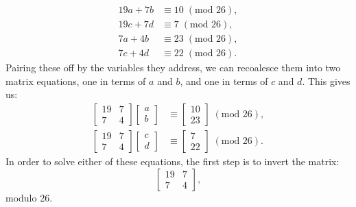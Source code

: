\documentclass{article}
\begin{document}
\begin{align*}
    19a + 7b &\equiv 10 \; (\text{mod } 26), \\
    19c + 7d &\equiv 7 \; (\text{mod } 26), \\
    7a + 4b &\equiv 23 \; (\text{mod } 26), \\
    7c + 4d &\equiv 22 \; (\text{mod } 26).
\end{align*}
Pairing these off by the variables they address, we can recoalesce them into two matrix equations, one in terms of $a$ and $b$, and one in terms of $c$ and $d$. This gives us:
\begin{align*}
    \begin{bmatrix}
        19 & 7 \\
        7 & 4
    \end{bmatrix} \begin{bmatrix}
        a \\
        b
    \end{bmatrix} &\equiv \begin{bmatrix}
        10 \\
        23
    \end{bmatrix} \; (\text{mod } 26), \\
    \begin{bmatrix}
        19 & 7 \\
        7 & 4
    \end{bmatrix} \begin{bmatrix}
        c \\
        d
    \end{bmatrix} &\equiv \begin{bmatrix}
        7 \\
        22
    \end{bmatrix} \; (\text{mod } 26).
\end{align*}
In order to solve either of these equations, the first step is to invert the matrix:
\[
    \begin{bmatrix}
        19 & 7 \\
        7 & 4
    \end{bmatrix},
\]
modulo 26. \medskip
\end{document}
